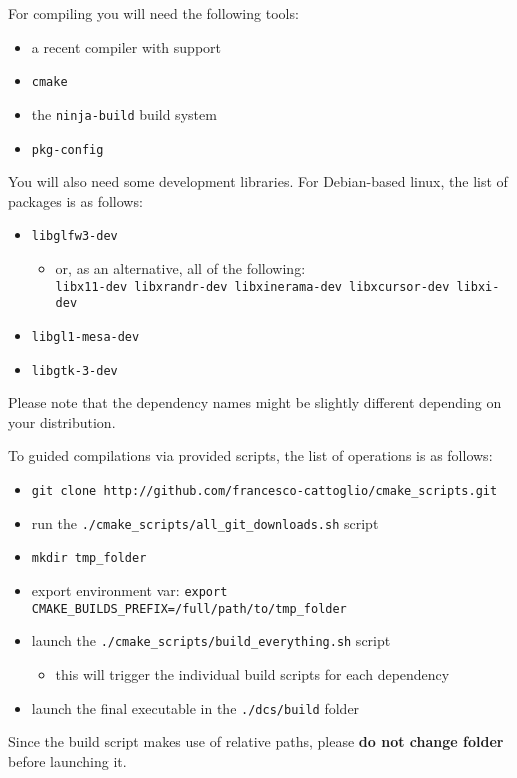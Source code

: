 For compiling you will need the following tools:
\begin{itemize}
    \item a recent compiler with  support
    \item \texttt{cmake}
    \item the \texttt{ninja-build} build system
    \item \texttt{pkg-config}
\end{itemize}

You will also need some development libraries. For Debian-based linux, the list of packages is as follows:
\begin{itemize}
    \item \texttt{libglfw3-dev}
    \begin{itemize}
        \item  or, as an alternative, all of the following: \\
            \verb|libx11-dev libxrandr-dev libxinerama-dev libxcursor-dev libxi-dev|
    \end{itemize}
    \item \texttt{libgl1-mesa-dev}
    \item \texttt{libgtk-3-dev}
\end{itemize}
Please note that the dependency names might be slightly different depending on your distribution.

To guided compilations via provided scripts, the list of operations is as follows:
\begin{itemize}
    \item \texttt{git clone http://github.com/francesco-cattoglio/cmake\_scripts.git}
    \item run the \texttt{./cmake\_scripts/all\_git\_downloads.sh} script
    \item \texttt{mkdir tmp\_folder}
    \item export environment var: \texttt{export CMAKE\_BUILDS\_PREFIX=/full/path/to/tmp\_folder}
    \item launch the \texttt{./cmake\_scripts/build\_everything.sh} script
    \begin{itemize}
        \item this will trigger the individual build scripts for each dependency
    \end{itemize}
    \item launch the final executable in the \texttt{./dcs/build} folder
\end{itemize}
Since the build script makes use of relative paths, please \textbf{do not change folder} before launching it.

